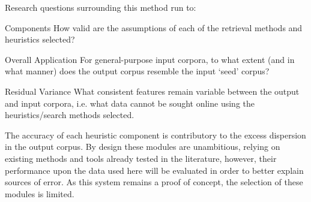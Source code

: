 Research questions surrounding this method run to:

\begin{itemizeTitle}

    \item[Components] How valid are the assumptions of each of the retrieval methods and heuristics selected?

    \item[Overall Application] For general-purpose input corpora, to what extent (and in what manner) does the output corpus resemble the input `seed' corpus?


    \item[Residual Variance] What consistent features remain variable between the output and input corpora, i.e. what data cannot be sought online using the heuristics/search methods selected.

\end{itemizeTitle}

The accuracy of each heuristic component is contributory to the excess dispersion in the output corpus.  By design these modules are unambitious, relying on existing methods and tools already tested in the literature, however, their performance upon the data used here will be evaluated in order to better explain sources of error.  As this system remains a proof of concept, the selection of these modules is limited.











